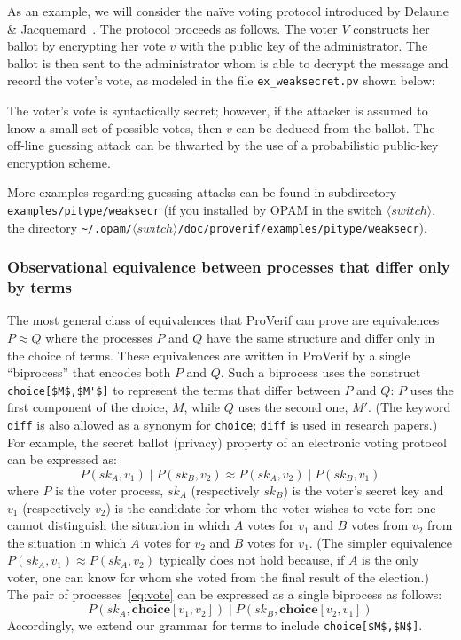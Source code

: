 \documentclass{book}
\newcommand{\nonterm}[1]{\langle\mathit{#1}\rangle}
\newcommand{\switchdir}{\nonterm{switch}}
\newcommand{\opamsubdir}[1]{\nolinkurl{~/.opam/}$\switchdir$\nolinkurl{/#1}}
\begin{document}
As an example, we will consider the na\"{i}ve voting protocol introduced by
Delaune \& Jacquemard~\cite{DF04}. The protocol proceeds as follows. The voter $V$
constructs her ballot by encrypting her vote $v$ with the public key of the
administrator. The ballot is then sent to the administrator whom is able
to decrypt the message and record the voter's vote, as modeled in the file
\texttt{{\docexdir}ex\_weaksecret.pv} shown below:
%

%
The voter's vote is syntactically secret; however, if the attacker is
assumed to know a small set of possible votes, then $v$ can be deduced
from the ballot. The off-line guessing attack can be thwarted by the
use of a probabilistic public-key encryption scheme.

More examples regarding guessing attacks can be found in
subdirectory {\tt examples/pitype/weaksecr} (if you installed by OPAM
in the switch $\switchdir$, the directory \opamsubdir{doc/proverif/examples/pitype/weaksecr}).

\subsubsection{Observational equivalence between processes that differ only by terms}\label{sec:choice}

The most general class of equivalences that ProVerif can prove are
equivalences $P \approx Q$ where the processes $P$ and $Q$ have the
same structure and differ only in the choice of terms. These
equivalences are written in ProVerif by a single ``biprocess'' that
encodes both $P$ and $Q$. Such a biprocess uses the construct
\lstinline!choice[$M$,$M'$]! to represent the terms that differ
between $P$ and $Q$: $P$ uses the first component of the choice, $M$,
while $Q$ uses the second one, $M'$. (The keyword \lstinline!diff! is
also allowed as a synonym for \lstinline!choice!; \lstinline!diff!
is used in research papers.)
%
For example, the secret ballot (privacy) property of an electronic voting protocol can be expressed as:
\begin{equation}
	P(sk_A, v_1) \mid P(sk_B, v_2) \approx P(sk_A, v_2) \mid P(sk_B, v_1)
\label{eq:vote}
\end{equation}
where $P$ is the voter process, $sk_A$ (respectively $sk_B$) is the voter's secret key and $v_1$ (respectively $v_2$) is the candidate for whom the voter wishes to vote for: one cannot distinguish the situation in which $A$ votes for $v_1$ and $B$ votes from $v_2$ from the situation in which $A$ votes for $v_2$ and $B$ votes for $v_1$. (The simpler equivalence $P(sk_A, v_1) \approx P(sk_A, v_2)$ typically does not hold because, if $A$ is the only voter, one can know for whom she voted from the final result of the election.) The pair of processes~\eqref{eq:vote} can be expressed as a single biprocess as follows:
\[
	P(sk_A, \mathbf{choice}[v_1,v_2]) \mid P(sk_B, \mathbf{choice}[v_2,v_1])
\]
Accordingly, we extend our grammar for terms to include \lstinline!choice[$M$,$N$]!.
\end{document}
